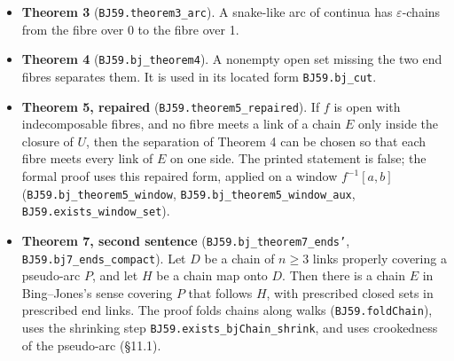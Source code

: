 \documentclass[11pt]{article}
\newcommand{\lean}[1]{\texttt{#1}}
\begin{document}
\begin{itemize}
  \item \textbf{Theorem 3} (\lean{BJ59.\hspace{0pt}theorem3\_\hspace{0pt}arc}). A snake-like arc of continua has $\varepsilon$-chains from the fibre over 0 to the fibre over 1.
  \item \textbf{Theorem 4} (\lean{BJ59.\hspace{0pt}bj\_\hspace{0pt}theorem4}). A nonempty open set missing the two end fibres separates them. It is used in its located form \lean{BJ59.\hspace{0pt}bj\_\hspace{0pt}cut}.
  \item \textbf{Theorem 5, repaired} (\lean{BJ59.\hspace{0pt}theorem5\_\hspace{0pt}repaired}). If $f$ is open with indecomposable fibres, and no fibre meets a link of a chain $E$ only inside the closure of $U$, then the separation of Theorem 4 can be chosen so that each fibre meets every link of $E$ on one side. The printed statement is false; the formal proof uses this repaired form, applied on a window $f^{-1}[a, b]$ (\lean{BJ59.\hspace{0pt}bj\_\hspace{0pt}theorem5\_\hspace{0pt}window}, \lean{BJ59.\hspace{0pt}bj\_\hspace{0pt}theorem5\_\hspace{0pt}window\_\hspace{0pt}aux}, \lean{BJ59.\hspace{0pt}exists\_\hspace{0pt}window\_\hspace{0pt}set}).
  \item \textbf{Theorem 7, second sentence} (\lean{BJ59.\hspace{0pt}bj\_\hspace{0pt}theorem7\_\hspace{0pt}ends'}, \lean{BJ59.\hspace{0pt}bj7\_\hspace{0pt}ends\_\hspace{0pt}compact}). Let $D$ be a chain of $n \geq 3$ links properly covering a pseudo-arc $P$, and let $H$ be a chain map onto $D$. Then there is a chain $E$ in Bing--Jones's sense covering $P$ that follows $H$, with prescribed closed sets in prescribed end links. The proof folds chains along walks (\lean{BJ59.\hspace{0pt}foldChain}), uses the shrinking step \lean{BJ59.\hspace{0pt}exists\_\hspace{0pt}bjChain\_\hspace{0pt}shrink}, and uses crookedness of the pseudo-arc (\S{}11.1).

\end{itemize}
\end{document}
